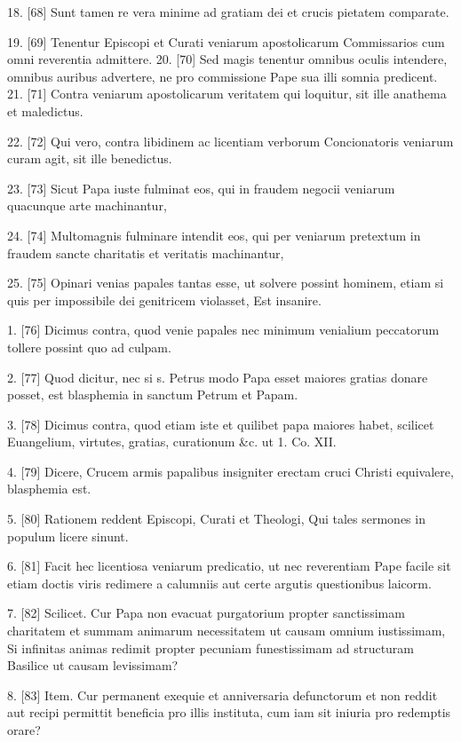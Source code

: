 18. [68] Sunt tamen re vera minime ad gratiam dei et crucis pietatem
comparate.

19. [69] Tenentur Episcopi et Curati veniarum apostolicarum
Commissarios cum omni reverentia admittere. 20. [70] Sed magis
tenentur omnibus oculis intendere, omnibus auribus advertere, ne pro
commissione Pape sua illi somnia predicent. 21. [71] Contra veniarum
apostolicarum veritatem qui loquitur, sit ille anathema et maledictus.

22. [72] Qui vero, contra libidinem ac licentiam verborum Concionatoris
veniarum curam agit, sit ille benedictus.

23. [73] Sicut Papa iuste fulminat eos, qui in fraudem negocii veniarum
quacunque arte machinantur,

24. [74] Multomagnis fulminare intendit eos, qui per veniarum pretextum
in fraudem sancte charitatis et veritatis machinantur,

25. [75] Opinari venias papales tantas esse, ut solvere possint
hominem, etiam si quis per impossibile dei genitricem violasset, Est
insanire.

1. [76] Dicimus contra, quod venie papales nec minimum venialium
peccatorum tollere possint quo ad culpam.

2. [77] Quod dicitur, nec si s. Petrus modo Papa esset maiores gratias
donare posset, est blasphemia in sanctum Petrum et Papam.

3. [78] Dicimus contra, quod etiam iste et quilibet papa maiores habet,
scilicet Euangelium, virtutes, gratias, curationum \&c. ut 1. Co. XII.

4. [79] Dicere, Crucem armis papalibus insigniter erectam cruci Christi
equivalere, blasphemia est.

5. [80] Rationem reddent Episcopi, Curati et Theologi, Qui tales
sermones in populum licere sinunt.

6. [81] Facit hec licentiosa veniarum predicatio, ut nec reverentiam
Pape facile sit etiam doctis viris redimere a calumniis aut certe
argutis questionibus laicorm.

7. [82] Scilicet. Cur Papa non evacuat purgatorium propter sanctissimam
charitatem et summam animarum necessitatem ut causam omnium
iustissimam, Si infinitas animas redimit propter pecuniam funestissimam
ad structuram Basilice ut causam levissimam?

8. [83] Item. Cur permanent exequie et anniversaria defunctorum et non
reddit aut recipi permittit beneficia pro illis instituta, cum iam sit
iniuria pro redemptis orare?


